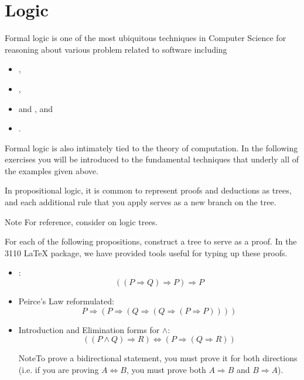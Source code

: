 \section*{Logic}
Formal logic is one of the most ubiquitous techniques in Computer Science for
reasoning about various problem related to software including
\begin{itemize}
  \item {},
\item
  ,
\item
   and
  , and
\item {}.
\end{itemize}
Formal logic is also intimately tied to the theory of computation. In the
following exercises you will be introduced to the fundamental
techniques that underly all of the examples given above.

\exercise{}

In propositional logic, it is common to represent proofs and
deductions as trees, and each additional rule that you apply serves as
a new branch on the tree.

\begin{note}{Note}
  For reference, consider
   on logic trees.
\end{note}

For each of the following propositions, construct a tree to serve as a
proof. In the 3110 LaTeX package, we have provided tools useful for
typing up these proofs.

\begin{itemize}
\item {}:
\[
((P \Rightarrow Q) \Rightarrow P) \Rightarrow P
\]

\item Peirce's Law reformulated:
\[
P \Rightarrow (P \Rightarrow (Q \Rightarrow (Q \Rightarrow (P
\Rightarrow P))))
\]

\item Introduction and Elimination forms for $\wedge$:
\[
((P \wedge Q) \Rightarrow R) \Longleftrightarrow (P \Rightarrow (Q
\Rightarrow R))
\]

\begin{note}{Note}To prove a bidirectional statement, you must prove
  it for both directions (i.e. if you are proving $A
  \Longleftrightarrow B$, you must prove both $A \Rightarrow B$ and $B
  \Rightarrow A$).
\end{note}

\end{itemize}

